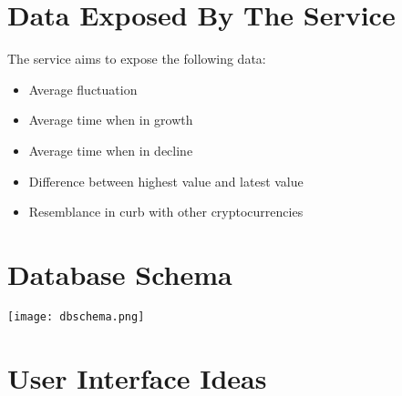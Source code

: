\section{Data Exposed By The Service}
The service aims to expose the following data:
\begin{itemize}
    \item Average fluctuation
    \item Average time when in growth
    \item Average time when in decline
    \item Difference between highest value and latest value
    \item Resemblance in curb with other cryptocurrencies
\end{itemize}
\section{Database Schema}
\begin{center}
    \texttt{[image: dbschema.png]}
\end{center}


\section{User Interface Ideas}